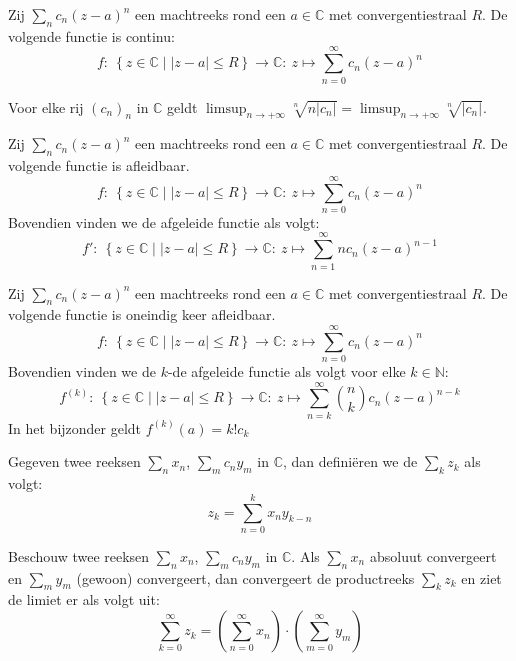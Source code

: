 \documentclass[main.tex]{subfiles}
\begin{document}
\begin{bgev}
  Zij $\sum_{n}c_{n}(z-a)^{n}$ een machtreeks rond een $a\in \mathbb{C}$ met convergentiestraal $R$.
  De volgende functie is continu:
  \[ f:\ \left\{ z \in \mathbb{C} \mid |z-a| \le R \right\} \rightarrow \mathbb{C}:\ z \mapsto \sum_{n=0}^{\infty}c_{n}(z-a)^{n}  \]
\end{bgev}

\begin{blem}
  Voor elke rij $(c_{n})_{n}$ in $\mathbb{C}$ geldt $\limsup_{n\rightarrow +\infty}\sqrt[n]{n|c_{n}|} = \limsup_{n\rightarrow +\infty}\sqrt[n]{|c_{n}|}$.
\end{blem}

\begin{bst}
  Zij $\sum_{n}c_{n}(z-a)^{n}$ een machtreeks rond een $a\in \mathbb{C}$ met convergentiestraal $R$.
  De volgende functie is afleidbaar.
  \[ f:\ \left\{ z \in \mathbb{C} \mid |z-a| \le R \right\} \rightarrow \mathbb{C}:\ z \mapsto \sum_{n=0}^{\infty}c_{n}(z-a)^{n}  \]
  Bovendien vinden we de afgeleide functie als volgt:
  \[ f':\ \left\{ z \in \mathbb{C} \mid |z-a| \le R \right\} \rightarrow \mathbb{C}:\ z \mapsto \sum_{n=1}^{\infty}nc_{n}(z-a)^{n-1}  \]
\end{bst}

\begin{bgev}
  Zij $\sum_{n}c_{n}(z-a)^{n}$ een machtreeks rond een $a\in \mathbb{C}$ met convergentiestraal $R$.
  De volgende functie is oneindig keer afleidbaar.
  \[ f:\ \left\{ z \in \mathbb{C} \mid |z-a| \le R \right\} \rightarrow \mathbb{C}:\ z \mapsto \sum_{n=0}^{\infty}c_{n}(z-a)^{n}  \]
  Bovendien vinden we de $k$-de afgeleide functie als volgt voor elke $k\in \mathbb{N}$:
  \[ f^{(k)}:\ \left\{ z \in \mathbb{C} \mid |z-a| \le R \right\} \rightarrow \mathbb{C}:\ z \mapsto \sum_{n=k}^{\infty}\binom{n}{k}c_{n}(z-a)^{n-k}  \]
  In het bijzonder geldt $f^{(k)}(a) = k!c_{k}$
\end{bgev}

\begin{de}
  Gegeven twee reeksen $\sum_{n}x_{n}$, $\sum_{m}c_{n}y_{m}$ in $\mathbb{C}$, dan defini\"eren we de  $\sum_{k}z_{k}$ als volgt:
  \[ z_{k} = \sum_{n=0}^{k}x_{n}y_{k-n} \]
\end{de}


\begin{bst}
  Beschouw twee reeksen $\sum_{n}x_{n}$, $\sum_{m}c_{n}y_{m}$ in $\mathbb{C}$.
  Als $\sum_{n}x_{n}$ absoluut convergeert en $\sum_{m}y_{m}$ (gewoon) convergeert, dan convergeert de productreeks $\sum_{k}z_{k}$ en ziet de limiet er als volgt uit:
  \[ \sum_{k=0}^{\infty}z_{k} = \left(\sum_{n=0}^{\infty}x_{n}\right) \cdot \left(\sum_{m=0}^{\infty}y_{m}\right) \]
\end{bst}
\end{document}

